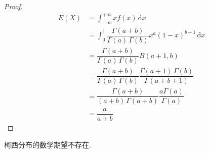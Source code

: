 \begin{proof}
    $$
    \begin{aligned}
        E(X) &= \int_{-\infty}^{+\infty} x f(x) \, \text{d}x \\
        &= \int_{0}^{1} \dfrac{\Gamma(a+b)}{\Gamma(a) \, \Gamma(b)} x^a (1-x)^{b-1} \, \text{d}x \\
        &= \dfrac{\Gamma(a+b)}{\Gamma(a) \, \Gamma(b)} B(a+1,b) \\
        &= \dfrac{\Gamma(a+b)}{\Gamma(a) \, \Gamma(b)} \dfrac{\Gamma(a+1) \, \Gamma(b)}{\Gamma(a+b+1)} \\
        &= \dfrac{\Gamma(a+b)}{(a+b) \, \Gamma(a+b)} \dfrac{a \Gamma(a)}{\Gamma(a)} \\
        &= \dfrac{a}{a+b}
    \end{aligned}
    $$
\end{proof}

\begin{conclusion}
    \indent 柯西分布的数学期望不存在.
\end{conclusion}

